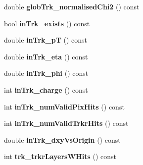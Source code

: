 \begin{DoxyCompactItemize}
\item 
\hypertarget{classran_1_1NtMuon_aaef9c3db9b4db48583dbd0308443b328}{double {\bfseries glob\-Trk\-\_\-normalised\-Chi2} () const }\label{classran_1_1NtMuon_aaef9c3db9b4db48583dbd0308443b328}

\item 
\hypertarget{classran_1_1NtMuon_a312847758a568ca1df115919c4729b8f}{bool {\bfseries in\-Trk\-\_\-exists} () const }\label{classran_1_1NtMuon_a312847758a568ca1df115919c4729b8f}

\item 
\hypertarget{classran_1_1NtMuon_aa992d32d65af13e198acd78754269e0b}{double {\bfseries in\-Trk\-\_\-p\-T} () const }\label{classran_1_1NtMuon_aa992d32d65af13e198acd78754269e0b}

\item 
\hypertarget{classran_1_1NtMuon_a5980458f2138d1e87b97f2ac4ee21cb1}{double {\bfseries in\-Trk\-\_\-eta} () const }\label{classran_1_1NtMuon_a5980458f2138d1e87b97f2ac4ee21cb1}

\item 
\hypertarget{classran_1_1NtMuon_ab6450f1784cadd6f5bbf702791b2da38}{double {\bfseries in\-Trk\-\_\-phi} () const }\label{classran_1_1NtMuon_ab6450f1784cadd6f5bbf702791b2da38}

\item 
\hypertarget{classran_1_1NtMuon_a48c00577d540b79894895681db169fda}{int {\bfseries in\-Trk\-\_\-charge} () const }\label{classran_1_1NtMuon_a48c00577d540b79894895681db169fda}

\item 
\hypertarget{classran_1_1NtMuon_a933123e54df9e15bac1de6bdfa3b5784}{int {\bfseries in\-Trk\-\_\-num\-Valid\-Pix\-Hits} () const }\label{classran_1_1NtMuon_a933123e54df9e15bac1de6bdfa3b5784}

\item 
\hypertarget{classran_1_1NtMuon_ac703f7c338834e6c9cb6b452e90dec2b}{int {\bfseries in\-Trk\-\_\-num\-Valid\-Trkr\-Hits} () const }\label{classran_1_1NtMuon_ac703f7c338834e6c9cb6b452e90dec2b}

\item 
\hypertarget{classran_1_1NtMuon_a2607d2f9dc04a07d0e39c7cb67615d1d}{double {\bfseries in\-Trk\-\_\-dxy\-Vs\-Origin} () const }\label{classran_1_1NtMuon_a2607d2f9dc04a07d0e39c7cb67615d1d}

\item 
\hypertarget{classran_1_1NtMuon_a305c0e0cddd4f4e62564ff25864ba288}{int {\bfseries trk\-\_\-trkr\-Layers\-W\-Hits} () const }\label{classran_1_1NtMuon_a305c0e0cddd4f4e62564ff25864ba288}


\end{DoxyCompactItemize}
